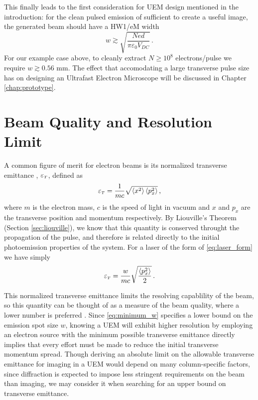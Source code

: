 This finally leads to the first consideration for UEM design mentioned in the introduction: for the clean pulsed emission of sufficient to create a useful image, the generated beam should have a HW1/eM width 
\begin{equation} \label{eq:minimum_w}
  w \gtrsim \sqrt{\frac{N e d}{\pi \varepsilon_0 V_{DC}}} \,\text{.}
\end{equation}
For our example case above, to cleanly extract $N \ge 10^8$ electrons/pulse we require $w \gtrsim 0.56 \text{ mm}$.
The effect that accomodating a large transverse pulse size has on designing an Ultrafast Electron Microscope will be discussed in Chapter \ref{chap:prototype}. 

\section{Beam Quality and Resolution Limit}

A common figure of merit for electron beams is its normalized transverse emittance \cite{jensen_emittance_2010}, $\varepsilon_{{\scriptscriptstyle T}}$, defined as 
\begin{equation} \label{eq:emittance_definition}
  \varepsilon_{{\scriptscriptstyle T}} = \frac{1}{m c} \sqrt{ \left < x^2 \right > \left < p_x^2 \right > } \,\text{,}
\end{equation}
where $m$ is the electron mass, $c$ is the speed of light in vacuum and $x$ and $p_x$ are the transverse position and momentum respectively.
By Liouville's Theorem (Section \ref{sec:liouville}), we know that this quantity is conserved throught the propagation of the pulse, and therefore is related directly to the initial photoemission properties of the system.
For a laser of the form of \ref{eq:laser_form} we have simply
\begin{equation} \label{eq:emittance_definition_w}
  \varepsilon_{{\scriptscriptstyle T}} = \frac{w}{m c} \sqrt{ \frac{\left < p_x^2 \right >}{2} } \,\text{.}
\end{equation}

This normalized transverse emittance limits the resolving capablility of the beam, so this quantity can be thought of as a measure of the beam quality, where a lower number is preferred \cite{berger_dc_2009}.
Since \ref{eq:minimum_w} specifies a lower bound on the emission spot size $w$, knowing a UEM will exhibit higher resolution by employing an electron source with the minimum possible transverse emittance directly implies that every effort must be made to reduce the initial transverse momentum spread.
Though deriving an absolute limit on the allowable transverse emittance for imaging in a UEM would depend on many column-specific factors, since diffraction is expected to impose less stringent requirements on the beam than imaging, we may consider it when searching for an upper bound on transverse emittance.

